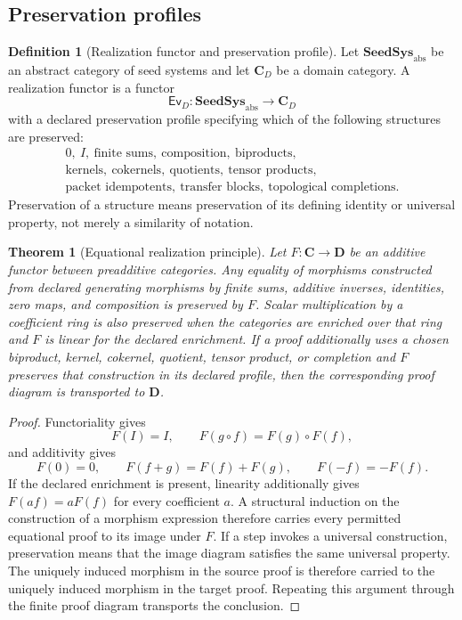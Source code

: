 \documentclass[11pt]{article}
\newtheorem{theorem}{Theorem}[section]
\theoremstyle{definition}
\newtheorem{definition}[definition]{Definition}
\theoremstyle{remark}
\theoremstyle{definition}\newtheorem{example}[theorem]{Example}
\newcommand{\RecordID}[1]{\label{record:#1}}
\newcommand{\Depends}[1]{}
\newcommand{\Exports}[1]{}
\begin{document}
\subsection{Preservation profiles}

\begin{definition}[Realization functor and preservation profile]
\label{def:realization-functor}
Let $\mathbf{SeedSys}_{\mathrm{abs}}$ be an abstract category of seed systems and let $\mathbf C_D$ be a domain category.  A realization functor is a functor
\[
\mathsf{Ev}_D:\mathbf{SeedSys}_{\mathrm{abs}}\longrightarrow\mathbf C_D
\]
with a declared preservation profile specifying which of the following structures are preserved:
\[
\begin{gathered}
0,\ I,\ \text{finite sums},\ \text{composition},\ \text{biproducts},\\
\text{kernels},\ \text{cokernels},\ \text{quotients},\ \text{tensor products},\\
\text{packet idempotents},\ \text{transfer blocks},\ \text{topological completions}.
\end{gathered}
\]
Preservation of a structure means preservation of its defining identity or universal property, not merely a similarity of notation.
\end{definition}
\RecordID{PSC-I-D-REALIZATION-FUNCTOR}

\begin{theorem}[Equational realization principle]
\label{thm:realization-export}
Let $F:\mathbf C\to\mathbf D$ be an additive functor between preadditive categories.  Any equality of morphisms constructed from declared generating morphisms by finite sums, additive inverses, identities, zero maps, and composition is preserved by $F$.  Scalar multiplication by a coefficient ring is also preserved when the categories are enriched over that ring and $F$ is linear for the declared enrichment.  If a proof additionally uses a chosen biproduct, kernel, cokernel, quotient, tensor product, or completion and $F$ preserves that construction in its declared profile, then the corresponding proof diagram is transported to $\mathbf D$.
\end{theorem}
\RecordID{PSC-I-T-REALIZATION-EXPORT}
\Depends{PSC-I-D-REALIZATION-FUNCTOR.}
\Exports{The formal criterion for semantic cross-domain transfer.}

\begin{proof}
Functoriality gives
\[
F(I)=I,
\qquad
F(g\circ f)=F(g)\circ F(f),
\]
and additivity gives
\[
F(0)=0,
\qquad
F(f+g)=F(f)+F(g),
\qquad
F(-f)=-F(f).
\]
If the declared enrichment is present, linearity additionally gives $F(af)=aF(f)$ for every coefficient $a$.  A structural induction on the construction of a morphism expression therefore carries every permitted equational proof to its image under $F$.  If a step invokes a universal construction, preservation means that the image diagram satisfies the same universal property.  The uniquely induced morphism in the source proof is therefore carried to the uniquely induced morphism in the target proof.  Repeating this argument through the finite proof diagram transports the conclusion.
\end{proof}
\end{document}
